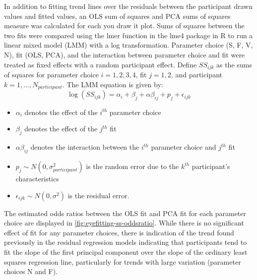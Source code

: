 \documentclass[12pt]{article}
\providecommand{\tightlist}{%
  \setlength{\itemsep}{0pt}\setlength{\parskip}{0pt}}
\begin{document}
In addition to fitting trend lines over the residuals between the
participant drawn values and fitted values, an OLS sum of squares and
PCA sums of squares measure was calculated for each you draw it plot.
Sums of squares between the two fits were compared using the lmer
function in the lme4 package in R \citep{lme4} to run a linear mixed
model (LMM) with a log transformation. Parameter choice (S, F, V, N),
fit (OLS, PCA), and the interaction between parameter choice and fit
were treated as fixed effects with a random participant effect. Define
\(SS_{ijk}\) as the sums of squares for parameter choice
\(i = 1,2,3,4\), fit \(j=1,2\), and participant
\(k = 1,...,N_{participant}\). The LMM equation is given by:
\begin{equation}
\log\left(SS_{ijk}\right) = \alpha_i + \beta_j + \alpha\beta_{ij} + p_{j} + \epsilon_{ijk}
\end{equation}

\begin{itemize}
\tightlist
\item
  \(\alpha_i\) denotes the effect of the \(i^{th}\) parameter choice
\item
  \(\beta_j\) denotes the effect of the \(j^{th}\) fit
\item
  \(\alpha\beta_{ij}\) denotes the interaction between the \(i^{th}\)
  parameter choice and \(j^{th}\) fit
\item
  \(p_{j} \sim N(0, \sigma^2_{participant})\) is the random error due to
  the \(k^{th}\) participant's characteristics
\item
  \(\epsilon_{ijk} \sim N(0, \sigma^2)\) is the residual error.
\end{itemize}

The estimated odds ratios between the OLS fit and PCA fit for each
parameter choice are displayed in \cref{fig:eyefitting-ss-oddsratio}.
While there is no significant effect of fit for any parameter choices,
there is indication of the trend found previously in the residual
regression models indicating that participants tend to fit the slope of
the first principal component over the slope of the ordinary least
squares regression line, particularly for trends with large variation
(parameter choices N and F).
\end{document}
